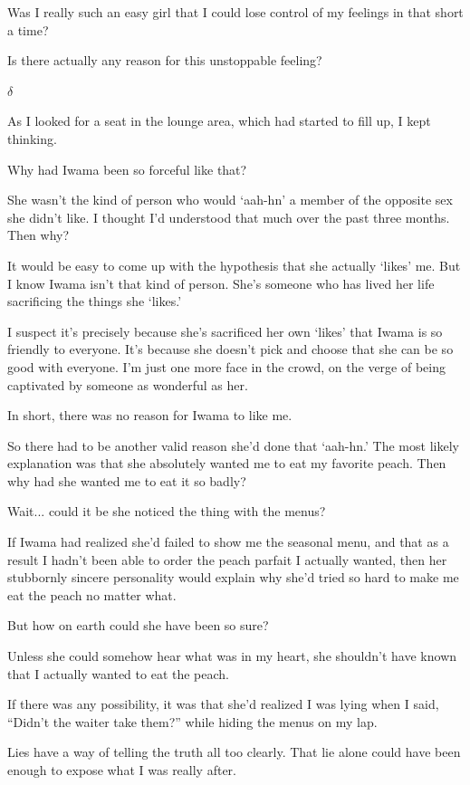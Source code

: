 \documentclass[
    a4paper,
    12pt,
    twoside,
    openany,
    UTF8,
    fontset=windows
]{ctexbook}
\begin{document}
Was I really such an easy girl that I could lose control of my feelings in that short a time?

Is there actually any reason for this unstoppable feeling?

$\delta$

As I looked for a seat in the lounge area, which had started to fill up, I kept thinking.

Why had Iwama been so forceful like that?

She wasn't the kind of person who would `aah-hn' a member of the opposite sex she didn't like. I thought I'd understood that much over the past three months. Then why?

It would be easy to come up with the hypothesis that she actually `likes' me. But I know Iwama isn't that kind of person. She's someone who has lived her life sacrificing the things she `likes.'

I suspect it's precisely because she's sacrificed her own `likes' that Iwama is so friendly to everyone. It's because she doesn't pick and choose that she can be so good with everyone. I'm just one more face in the crowd, on the verge of being captivated by someone as wonderful as her.

In short, there was no reason for Iwama to like me.

So there had to be another valid reason she'd done that `aah-hn.' The most likely explanation was that she absolutely wanted me to eat my favorite peach. Then why had she wanted me to eat it so badly?

Wait... could it be she noticed the thing with the menus?

If Iwama had realized she'd failed to show me the seasonal menu, and that as a result I hadn't been able to order the peach parfait I actually wanted, then her stubbornly sincere personality would explain why she'd tried so hard to make me eat the peach no matter what.

But how on earth could she have been so sure?

Unless she could somehow hear what was in my heart, she shouldn't have known that I actually wanted to eat the peach.

If there was any possibility, it was that she'd realized I was lying when I said, ``Didn't the waiter take them?'' while hiding the menus on my lap.

Lies have a way of telling the truth all too clearly. That lie alone could have been enough to expose what I was really after.
\end{document}
